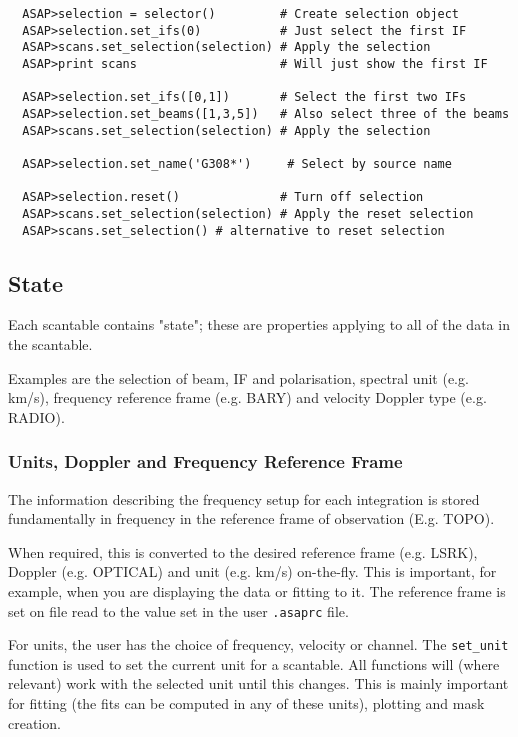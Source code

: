\documentclass[11pt]{article}
\newcommand{\cmd}[1]{{\tt #1}}
\begin{document}
\begin{verbatim}
  ASAP>selection = selector()         # Create selection object
  ASAP>selection.set_ifs(0)           # Just select the first IF
  ASAP>scans.set_selection(selection) # Apply the selection
  ASAP>print scans                    # Will just show the first IF

  ASAP>selection.set_ifs([0,1])       # Select the first two IFs
  ASAP>selection.set_beams([1,3,5])   # Also select three of the beams
  ASAP>scans.set_selection(selection) # Apply the selection

  ASAP>selection.set_name('G308*')     # Select by source name

  ASAP>selection.reset()              # Turn off selection
  ASAP>scans.set_selection(selection) # Apply the reset selection
  ASAP>scans.set_selection() # alternative to reset selection

\end{verbatim}

\subsection{State}

Each scantable contains "state"; these are
properties applying to all of the data in the scantable.

Examples are the selection of beam, IF and polarisation,  spectral unit
(e.g. km/s), frequency reference frame (e.g. BARY) and velocity Doppler
type (e.g. RADIO).

\subsubsection{Units, Doppler and Frequency Reference Frame}

The information describing the frequency setup for each integration
is stored fundamentally in frequency in the reference frame
of observation (E.g. TOPO).

When required, this is converted to the desired reference frame
(e.g. LSRK), Doppler (e.g. OPTICAL) and unit (e.g. km/s) on-the-fly.
This is important, for example, when you are displaying the data or
fitting to it. The reference frame is set on file read to the value
set in the user \cmd{.asaprc} file.

For units, the user has the choice of frequency, velocity or channel.
The \cmd{set\_unit} function is used to set the current unit for a
scantable. All functions will (where relevant) work with the selected
unit until this changes. This is mainly important for fitting (the fits
can be computed in any of these units), plotting and mask creation.
\end{document}
